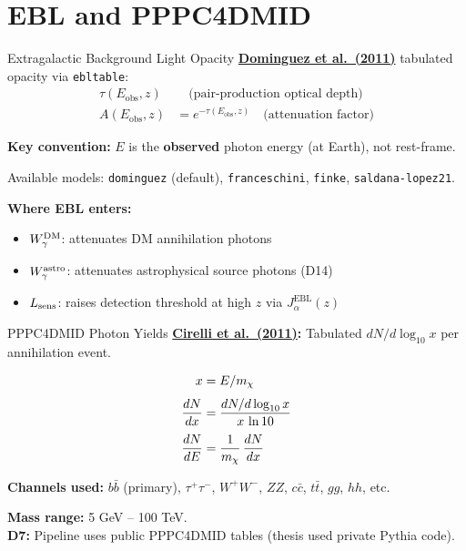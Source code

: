 \section{EBL and PPPC4DMID}

\begin{frame}{Extragalactic Background Light Opacity}
\textbf{\href{https://arxiv.org/abs/1007.1459}{Dominguez et al.\ (2011)}} tabulated opacity via \texttt{ebltable}:
\begin{align}
\tau(E_{\mathrm{obs}}, z) &\quad\text{(pair-production optical depth)} \\[4pt]
A(E_{\mathrm{obs}}, z) &= e^{-\tau(E_{\mathrm{obs}}, z)} \quad\text{(attenuation factor)}
\end{align}

\vspace{0.3cm}
\textbf{Key convention:} $E$ is the \textbf{observed} photon energy (at Earth), not rest-frame.

\vspace{0.2cm}
Available models: \texttt{dominguez} (default), \texttt{franceschini}, \texttt{finke}, \texttt{saldana-lopez21}.

\vspace{0.3cm}
\textbf{Where EBL enters:}
\begin{itemize}
    \item $W_\gamma^{\mathrm{DM}}$: attenuates DM annihilation photons
    \item $W_\gamma^{\mathrm{astro}}$: attenuates astrophysical source photons (D14)
    \item $L_{\mathrm{sens}}$: raises detection threshold at high $z$ via $J_\alpha^{\mathrm{EBL}}(z)$
\end{itemize}
\end{frame}

\begin{frame}{PPPC4DMID Photon Yields}
\textbf{\href{https://arxiv.org/abs/1012.4515}{Cirelli et al.\ (2011)}:} Tabulated $dN/d\log_{10} x$ per annihilation event.

\begin{align}
x &= E / m_\chi \\[3pt]
\frac{dN}{dx} &= \frac{dN/d\log_{10} x}{x\,\ln 10} \\[3pt]
\frac{dN}{dE} &= \frac{1}{m_\chi}\,\frac{dN}{dx}
\end{align}

\vspace{0.2cm}
\textbf{Channels used:} $b\bar{b}$ (primary), $\tau^+\tau^-$, $W^+W^-$, $ZZ$, $c\bar{c}$, $t\bar{t}$, $gg$, $hh$, etc.

\vspace{0.2cm}
\textbf{Mass range:} 5 GeV -- 100 TeV.\\[4pt]
\textbf{D7:} Pipeline uses public PPPC4DMID tables (thesis used private Pythia code).
\end{frame}
